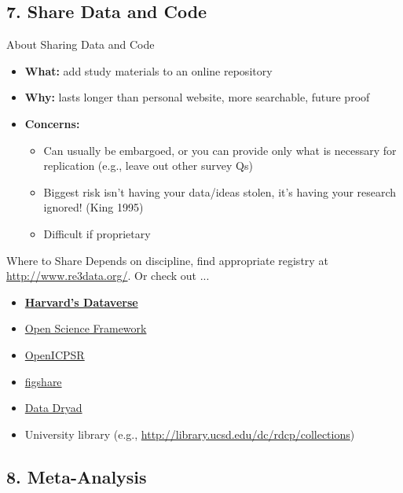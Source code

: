 \documentclass[12pt, compress]{beamer} %
\let\noteitem\item %
\renewcommand{\item}{ 
	\noteitem\vspace{\fill}
	}
\begin{document}
		
\subsection{7. Share Data and Code}

	\begin{frame}{About Sharing Data and Code}
		\begin{itemize}
			\item \textbf{What:} add study materials to an online repository
			\item \textbf{Why:} lasts longer than personal website, more searchable, future proof
			\item \textbf{Concerns:} 
				\begin{itemize}
					\item Can usually be embargoed, or you can provide only what is necessary for replication (e.g., leave out other survey Qs)
					\item Biggest risk isn't having your data/ideas stolen, it's having your research ignored! (King 1995)
					\item Difficult if proprietary
				\end{itemize}
		\end{itemize}
	\end{frame}
	
	\begin{frame}{Where to Share}
		Depends on discipline, find appropriate registry at \url{http://www.re3data.org/}. Or check out ... 
		
		\begin{itemize}
			\item \textbf{\href{https://dataverse.harvard.edu/}{Harvard’s Dataverse} }
			\item \href{https://osf.io/}{Open Science Framework}
			\item \href{https://www.openicpsr.org/openicpsr/}{OpenICPSR}
			\item \href{https://figshare.com/}{figshare}
			\item \href{http://datadryad.org/}{Data Dryad}
			\item University library (e.g., \url{http://library.ucsd.edu/dc/rdcp/collections})
		\end{itemize}		
	\end{frame}


\subsection{8. Meta-Analysis}
	
\end{document}
